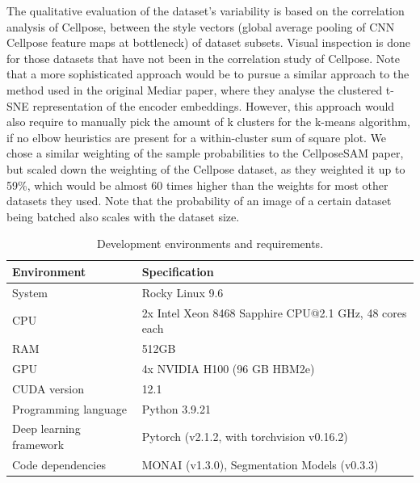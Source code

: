 The qualitative evaluation of the dataset's variability is based on the correlation analysis of Cellpose, between the style vectors (global average pooling of CNN Cellpose feature maps at bottleneck) of dataset subsets. Visual inspection is done for those datasets that have not been in the correlation study of Cellpose. Note that a more sophisticated approach would be to pursue a similar approach to the method used in the original Mediar paper, where they analyse the clustered t-SNE representation of the encoder embeddings. However, this approach would also require to manually pick the amount of k clusters for the k-means algorithm, if no elbow heuristics are present for a within-cluster sum of square plot. We chose a similar weighting of the sample probabilities to the CellposeSAM paper, but scaled down the weighting of the Cellpose dataset, as they weighted it up to 59\%, which would be almost 60 times higher than the weights for most other datasets they used. Note that the probability of an image of a certain dataset being batched also scales with the dataset size.

\begin{table}[ht]
\centering
\footnotesize
\caption{Development environments and requirements.}
\label{Tab:env}
\begin{tabular}{l l}
\hline\hline
\textbf{Environment} & \textbf{Specification} \\
\hline
System & Rocky Linux 9.6 \\
CPU & 2x Intel Xeon 8468 Sapphire CPU@2.1 GHz, 48 cores each \\
RAM & 512GB\\
GPU & 4x NVIDIA H100 (96 GB HBM2e) \\
CUDA version & 12.1 \\
Programming language & Python 3.9.21 \\
Deep learning framework & Pytorch (v2.1.2, with torchvision v0.16.2) \\
Code dependencies & MONAI (v1.3.0), Segmentation Models (v0.3.3) \\
\hline
\end{tabular}
\end{table}

